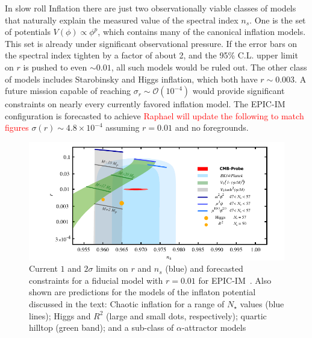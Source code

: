 In slow roll Inflation there are just two observationally viable classes of models that naturally explain the measured value of the spectral index $n_s$. 
One is the set of potentials $V(\phi)\propto\phi^p$, which contains many of the canonical inflation models. This 
set is already under significant observational pressure. If the error bars on the spectral index tighten by a factor of about 2, 
and the 95\% C.L. upper limit on $r$ is pushed to even $\sim0.01$, all such models would be ruled out. 
The other class of models includes Starobinsky and Higgs inflation, which both have $r\sim0.003$. A future mission 
capable of reaching $\sigma_r\sim\mathcal{O}(10^{-4})$ would provide significant constraints on nearly every currently favored 
inflation model. The EPIC-IM configuration is forecasted to achieve \textcolor{red}{Raphael will update the following to match figures} $\sigma(r)\sim4.8 \times 10^{-4}$ assuming $r=0.01$ 
and no foregrounds.
\begin{figure}[ht!]
\hspace{-0.2in}
\parbox{4.in}{\centerline {
\includegraphics[width=4.5in]{figs/nsrlabeledrp01v1} } }
\hspace{-0.05in}
\parbox{2.5in}{
\caption{ \small \setlength{\baselineskip}{0.95\baselineskip}
Current $1$ and $2\sigma $ limits on $r$ and $n_{s}$ (blue) and forecasted constraints for a fiducial model with $r=0.01$ for 
EPIC-IM~\cite{Array:2015xqh}. Also shown are predictions 
for the models of the inflaton potential discussed in the text: Chaotic inflation for a range of $N_\star$ values (blue lines); 
Higgs and $R^2$ (large and small dots, respectively);  quartic hilltop (green band); and a sub-class of $\alpha$-attractor
models~\cite{Kallosh:2013hoa}
\label{fig:nsrp01} } }
\vspace{-0.1in}
\end{figure}

